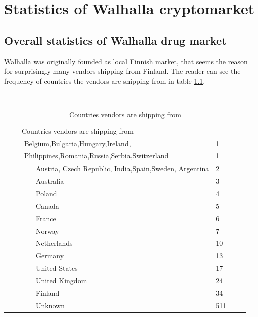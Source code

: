 \documentclass[
  digital, %
  table,   %
  lof,     %
  lot,     %
  oneside
]{fithesis3}
\begin{document}
\chapter{Statistics of Walhalla cryptomarket}



\section{Overall statistics of Walhalla drug market}

Walhalla was originally founded as local Finnish market,
that seems the reason for surprisingly many vendors shipping from Finland.
The reader can see the frequency of countries the vendors are shipping from in table \ref{shipcount}.

\begin{table}
    \caption{Countries vendors are shipping from}
    \label{shipcount}
    \begin{tabular}{|l|l|}
    Countries vendors are shipping from\\
      Belgium,Bulgaria,Hungary,Ireland, & 1\\
      Philippines,Romania,Russia,Serbia,Switzerland& 1   \\
        Austria, Czech Republic, India,Spain,Sweden, Argentina  & 2   \\
        Australia                                    & 3   \\ 
        Poland                                       & 4   \\ 
        Canada                                       & 5   \\ 
        France                                       & 6   \\ 
        Norway                                       & 7   \\ 
        Netherlands                                  & 10  \\ 
        Germany                                      & 13  \\ 
        United States                                & 17  \\ 
        United Kingdom                               & 24  \\ 
        Finland                                      & 34  \\ 
        Unknown                                      & 511  
    \end{tabular}
\end{table}
\end{document}
